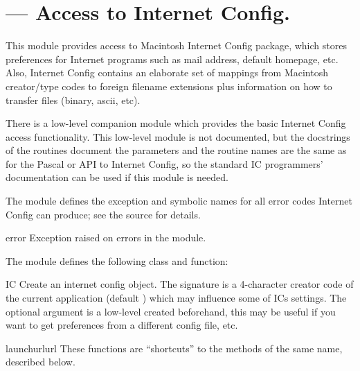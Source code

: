 \section{ ---
         Access to Internet Config.}




This module provides access to Macintosh Internet Config package,
which stores preferences for Internet programs such as mail address,
default homepage, etc. Also, Internet Config contains an elaborate set
of mappings from Macintosh creator/type codes to foreign filename
extensions plus information on how to transfer files (binary, ascii,
etc).

There is a low-level companion module
 which provides the basic
Internet Config access functionality.  This low-level module is not
documented, but the docstrings of the routines document the parameters
and the routine names are the same as for the Pascal or \C{} API to
Internet Config, so the standard IC programmers' documentation can be
used if this module is needed.

The  module defines the  exception and
symbolic names for all error codes Internet Config can produce; see
the source for details.

\begin{excdesc}{error}
Exception raised on errors in the  module.
\end{excdesc}


The  module defines the following class and function:

\begin{classdesc}{IC}{}
Create an internet config object. The signature is a 4-character creator
code of the current application (default ) which may
influence some of ICs settings. The optional  argument is a
low-level  created beforehand, this may be
useful if you want to get preferences from a different config file,
etc.
\end{classdesc}

\begin{funcdesc}{launchurl}{url}
These functions are ``shortcuts'' to the methods of the same name,
described below.
\end{funcdesc}


